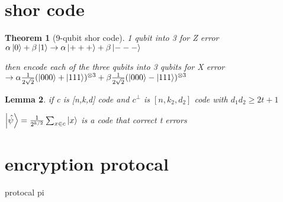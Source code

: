 \documentclass[10pt]{article}
\theoremstyle{break}
\newtheorem{thm}{Theorem}[subsection]
\newtheorem{lem}[thm]{Lemma}
\begin{document}
\section{shor code}
    \begin{thm}[9-qubit shor code]
        1 qubit into 3 for Z error 
        $\alpha \ket{0}+\beta\ket{1} \rightarrow \alpha\ket{+++}+\beta\ket{---}$

        then encode each of the three qubits into 3 qubits for X error 
        $\rightarrow \alpha\frac{1}{2\sqrt{2}}(\ket{000}+\ket{111})^{\otimes 3}+\beta\frac{1}{2\sqrt{2}}(\ket{000}-\ket{111})^{\otimes 3}$
    \end{thm}

    \begin{lem}
        if c is [n,k,d] code and $c^\perp$ is $[n,k_2,d_2]$ code with $d_1 d_2 \geq 2t+1$ 

        $\ket{\hat{\psi}} = \frac{1}{2^{k/2}}\sum_{x\in c}\ket{x}$ is a code that correct t errors
    \end{lem}

\section{encryption protocal}

    protocal pi 
\end{document}
